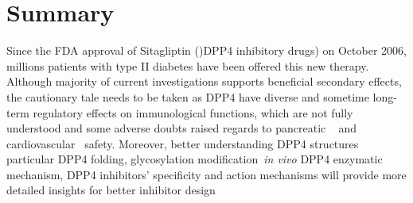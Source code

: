 \section{\label{chap:Sum} Summary}
Since the FDA approval of Sitagliptin ()DPP4 inhibitory drugs) on October 2006, millions patients with type II diabetes have been offered this new therapy. Although majority of current investigations supports beneficial secondary effects, the cautionary tale needs to be taken as DPP4 have diverse and sometime long-term regulatory effects on immunological functions, which are not fully understood and some adverse doubts raised regards to pancreatic ~\cite{Egan2014, Jermendy2016} and cardiovascular~\cite{Scirica2013} safety. Moreover, better understanding DPP4 structures particular DPP4 folding, glycosylation  modification~\textit{in vivo} DPP4 enzymatic mechanism, DPP4 inhibitors' specificity and action mechanisms will provide more detailed insights for better inhibitor design 
